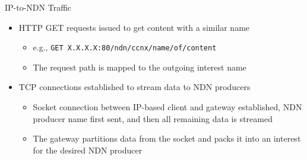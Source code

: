 \documentclass[handout]{beamer}
\begin{document}
\begin{frame}{IP-to-NDN Traffic}
	\begin{itemize}
		\item HTTP GET requests issued to get content with a similar name
		\begin{itemize}
			\item e.g., {\tt GET X.X.X.X:80/ndn/ccnx/name/of/content}
			\item The request path is mapped to the outgoing interest name 
		\end{itemize}
		\item TCP connections established to stream data to NDN producers
		\begin{itemize}
			\item Socket connection between IP-based client and gateway established, NDN producer name first sent, and then all remaining data is streamed
			\item The gateway partitions data from the socket and packs it into an interest for the desired NDN producer
		\end{itemize}
	\end{itemize}
\end{frame}
\end{document}
